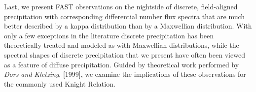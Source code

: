 Last, we present FAST observations on the nightside of discrete,
field-aligned precipitation with corresponding differential number
flux spectra that are much better described by a kappa distribution
than by a Maxwellian distribution. With only a few exceptions in the
literature discrete precipitation has been theoretically treated and
modeled as with Maxwellian distributions, while the spectral shapes of
discrete precipitation that we present have often been viewed as a
feature of diffuse precipitation. Guided by theoretical work performed
by \textsl{Dors and Kletzing}, [1999], we examine the implications of
these observations for the commonly used Knight Relation.


% 
